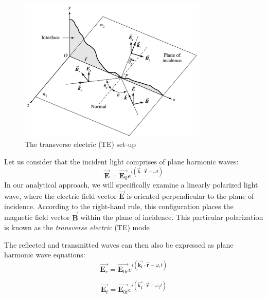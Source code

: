 \begin{figure}
  \centering
  \includegraphics[width=0.8\textwidth]{Chapters/Figures/Incident, Relfected, and Transmitted Ray for TE Mode.png}
  \caption{The transverse electric (TE) set-up}
\end{figure}

Let us consider that the incident light comprises of plane harmonic waves:
\begin{equation} \label{Plane harmonic wave equation - incident}
\vec{\mathbf{E}} = \vec{\mathbf{E}_0} e^{i(\vec{\mathbf{k}} \cdot \vec{\mathbf{r}} - \omega t)}
\end{equation}
In our analytical approach, we will specifically examine a linearly polarized light wave, where the electric field vector $\vec{\mathbf{E}}$ is oriented perpendicular to the plane of incidence. According to the right-hand rule, this configuration places the magnetic field vector $\vec{\mathbf{B}}$ within the plane of incidence. This particular polarization is known as the \textit{transverse electric} (TE) mode

The reflected and transmitted waves can then also be expressed as plane harmonic wave equations:
\begin{equation} \label{Plane harmonic wave equation - reflected}
\vec{\mathbf{E}_r} = \vec{\mathbf{E}_{0r}} e^{i(\vec{\mathbf{k_r}} \cdot \vec{\mathbf{r}} - \omega_r t)}
\end{equation}

\begin{equation} \label{Plane harmonic wave equation - refracted}
\vec{\mathbf{E}_t} = \vec{\mathbf{E}_{0t}} e^{i(\vec{\mathbf{k_t}} \cdot \vec{\mathbf{r}} - \omega_t t)}
\end{equation}

